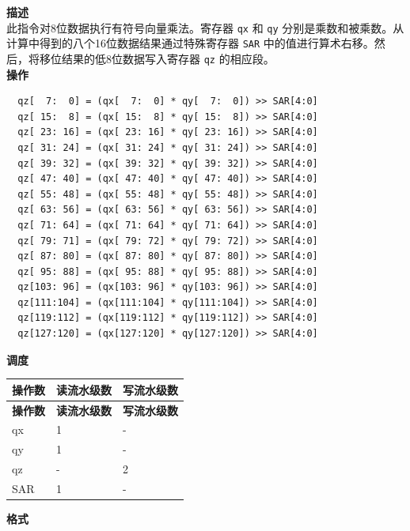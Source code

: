 \textbf{描述}\\
此指令对8位数据执行有符号向量乘法。寄存器 \lstinline{qx} 和 \lstinline{qy} 分别是乘数和被乘数。从计算中得到的八个16位数据结果通过特殊寄存器 \lstinline{SAR} 中的值进行算术右移。然后，将移位结果的低8位数据写入寄存器 \lstinline{qz} 的相应段。\\
\textbf{操作}
\begin{lstlisting}
  qz[  7:  0] = (qx[  7:  0] * qy[  7:  0]) >> SAR[4:0]
  qz[ 15:  8] = (qx[ 15:  8] * qy[ 15:  8]) >> SAR[4:0]
  qz[ 23: 16] = (qx[ 23: 16] * qy[ 23: 16]) >> SAR[4:0]
  qz[ 31: 24] = (qx[ 31: 24] * qy[ 31: 24]) >> SAR[4:0]
  qz[ 39: 32] = (qx[ 39: 32] * qy[ 39: 32]) >> SAR[4:0]
  qz[ 47: 40] = (qx[ 47: 40] * qy[ 47: 40]) >> SAR[4:0]
  qz[ 55: 48] = (qx[ 55: 48] * qy[ 55: 48]) >> SAR[4:0]
  qz[ 63: 56] = (qx[ 63: 56] * qy[ 63: 56]) >> SAR[4:0]
  qz[ 71: 64] = (qx[ 71: 64] * qy[ 71: 64]) >> SAR[4:0]
  qz[ 79: 71] = (qx[ 79: 72] * qy[ 79: 72]) >> SAR[4:0]
  qz[ 87: 80] = (qx[ 87: 80] * qy[ 87: 80]) >> SAR[4:0]
  qz[ 95: 88] = (qx[ 95: 88] * qy[ 95: 88]) >> SAR[4:0]
  qz[103: 96] = (qx[103: 96] * qy[103: 96]) >> SAR[4:0]
  qz[111:104] = (qx[111:104] * qy[111:104]) >> SAR[4:0]
  qz[119:112] = (qx[119:112] * qy[119:112]) >> SAR[4:0]
  qz[127:120] = (qx[127:120] * qy[127:120]) >> SAR[4:0]

\end{lstlisting}


\textbf{调度}\\
\begin{longtable}[c]{|l|l|l|}
    \hline
    \rowcolor{lightgray}
    \textbf{操作数} & \textbf{读流水级数} & \textbf{写流水级数} \\\hline
    \endfirsthead
    \hline
    \rowcolor{lightgray}
     \textbf{操作数} & \textbf{读流水级数} & \textbf{写流水级数} \\\hline
    \endhead
    \hline
    \endfoot

    qx & 1 & - \\\hline
  qy & 1 & - \\\hline
     qz & - & 2 \\\hline
    SAR & 1 & -

\end{longtable}

\textbf{格式}\\


